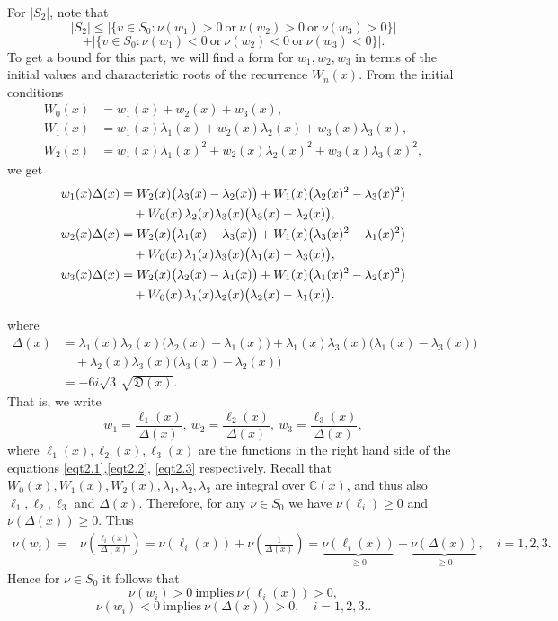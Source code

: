 \documentclass[12pt]{amsart}
\begin{document}
For $|S_{2}|$, note that
\[
|S_{2}| \leq |\{ v \in S_{0} : \nu(w_{1}) > 0 \ \text{or}\ \nu(w_{2}) > 0 \ \text{or}\ \nu(w_{3}) > 0 \}|
\]
\[
+ |\{ v \in S_{0} : \nu(w_{1}) < 0 \ \text{or}\ \nu(w_{2}) < 0 \ \text{or}\ \nu(w_{3}) < 0\}|.
\]
To get a bound for this part, we will find a form for $w_1,w_2,w_3$ in terms of the initial values and characteristic roots of the recurrence $W_n(x)$. From the initial conditions
\begin{align*}
 W_0(x) &= w_1(x)+w_2(x)+w_3(x),\\  
 W_1(x) &= w_1(x)\lambda_1(x) + w_2(x)\lambda_2(x) + w_3(x)\lambda_3(x),\\
 W_2(x) &= w_1(x)\lambda_1(x)^2 + w_2(x)\lambda_2(x)^2 + w_3(x)\lambda_3(x)^2, 
\end{align*}
we get
\begin{align}
w_1(x)\Delta(x) &= W_2(x)\big(\lambda_3(x)-\lambda_2(x)\big) 
 + W_1(x)\big(\lambda_2(x)^2-\lambda_3(x)^2\big) \notag\\
&\quad + W_0(x)\,\lambda_2(x)\lambda_3(x)\big(\lambda_3(x)-\lambda_2(x)\big), \label{eqt2.1} \\ 
w_2(x)\Delta(x) &= W_2(x)\big(\lambda_1(x)-\lambda_3(x)\big) 
 + W_1(x)\big(\lambda_3(x)^2-\lambda_1(x)^2\big)\notag\\
&\quad + W_0(x)\,\lambda_1(x)\lambda_3(x)\big(\lambda_1(x)-\lambda_3(x)\big), \label{eqt2.2}\\
w_3(x)\Delta(x) &= W_2(x)\big(\lambda_2(x)-\lambda_1(x)\big) 
 + W_1(x)\big(\lambda_1(x)^2-\lambda_2(x)^2\big) \notag \\
&\quad + W_0(x)\,\lambda_1(x)\lambda_2(x)\big(\lambda_2(x)-\lambda_1(x)\big). \label{eqt2.3}
\end{align}

where
\begin{align*}
\Delta(x) &= \lambda_1(x)\lambda_2(x)\big(\lambda_2(x)-\lambda_1(x)\big)
+ \lambda_1(x)\lambda_3(x)\big(\lambda_1(x)-\lambda_3(x)\big) \\
&\quad + \lambda_2(x)\lambda_3(x)\big(\lambda_3(x)-\lambda_2(x)\big) \\
&= -6i\sqrt{3}\,\sqrt{\mathfrak{D}(x)}.
\end{align*}
That is, we write
\[
w_1=\frac{\ell_1(x)}{\Delta(x)}, ~w_2=\frac{\ell_2(x)}{\Delta(x)}, ~w_3=\frac{\ell_3(x)}{\Delta(x)},
\]
where $\ell_1(x), \ell_2(x), \ell_3(x)$ are the functions in the right hand side of the equations \eqref{eqt2.1},\eqref{eqt2.2}, \eqref{eqt2.3} respectively. Recall that $W_{0}(x), W_{1}(x), W_2(x), \lambda_{1}, \lambda_{2}, \lambda_{3}$ are integral over $\mathbb{C}(x)$, 
and thus also $\ell_1, \ell_2, \ell_3$ and $\Delta(x)$. 
Therefore, for any $\nu \in S_{0}$ we have $\nu(\ell_i)\geq 0$ and $\nu(\Delta(x))\geq 0$. Thus
\begin{align*}
   \nu(w_i)=&\nu\left(\frac{\ell_i(x)}{\Delta(x)}\right)= \nu(\ell_i(x)) + \nu \left( \frac{1}{\Delta(x)} \right)= \underbrace{\nu(\ell_i(x))}_{\geq 0}- \underbrace{\nu(\Delta(x))}_{\geq 0}, \quad i=1,2,3. 
\end{align*}
Hence for $\nu \in S_{0}$ it follows that
\[
\nu(w_{i}) > 0 \ \text{implies}\ \nu(\ell_i(x)) > 0,
\]
\[
\nu(w_{i}) < 0 \ \text{implies}\ \nu(\Delta(x)) > 0, \quad i=1,2,3..
\]
\end{document}
